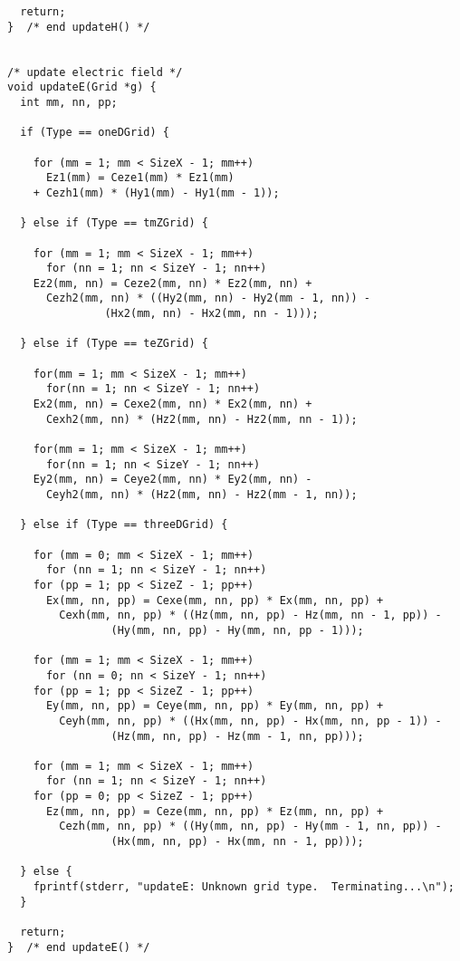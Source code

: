 \begin{program}
\begin{lstlisting}
  return;
}  /* end updateH() */


/* update electric field */
void updateE(Grid *g) {
  int mm, nn, pp;
  
  if (Type == oneDGrid) {
    
    for (mm = 1; mm < SizeX - 1; mm++)
      Ez1(mm) = Ceze1(mm) * Ez1(mm) 
	+ Cezh1(mm) * (Hy1(mm) - Hy1(mm - 1));
    
  } else if (Type == tmZGrid) {
    
    for (mm = 1; mm < SizeX - 1; mm++)
      for (nn = 1; nn < SizeY - 1; nn++)
	Ez2(mm, nn) = Ceze2(mm, nn) * Ez2(mm, nn) +
	  Cezh2(mm, nn) * ((Hy2(mm, nn) - Hy2(mm - 1, nn)) -
			   (Hx2(mm, nn) - Hx2(mm, nn - 1)));

  } else if (Type == teZGrid) {
    
    for(mm = 1; mm < SizeX - 1; mm++)
      for(nn = 1; nn < SizeY - 1; nn++)
	Ex2(mm, nn) = Cexe2(mm, nn) * Ex2(mm, nn) +
	  Cexh2(mm, nn) * (Hz2(mm, nn) - Hz2(mm, nn - 1));
    
    for(mm = 1; mm < SizeX - 1; mm++)
      for(nn = 1; nn < SizeY - 1; nn++)
	Ey2(mm, nn) = Ceye2(mm, nn) * Ey2(mm, nn) -
	  Ceyh2(mm, nn) * (Hz2(mm, nn) - Hz2(mm - 1, nn));
    
  } else if (Type == threeDGrid) {
    
    for (mm = 0; mm < SizeX - 1; mm++)
      for (nn = 1; nn < SizeY - 1; nn++)
	for (pp = 1; pp < SizeZ - 1; pp++)
	  Ex(mm, nn, pp) = Cexe(mm, nn, pp) * Ex(mm, nn, pp) +
	    Cexh(mm, nn, pp) * ((Hz(mm, nn, pp) - Hz(mm, nn - 1, pp)) -
				(Hy(mm, nn, pp) - Hy(mm, nn, pp - 1)));
    
    for (mm = 1; mm < SizeX - 1; mm++)
      for (nn = 0; nn < SizeY - 1; nn++)
	for (pp = 1; pp < SizeZ - 1; pp++)
	  Ey(mm, nn, pp) = Ceye(mm, nn, pp) * Ey(mm, nn, pp) + 
	    Ceyh(mm, nn, pp) * ((Hx(mm, nn, pp) - Hx(mm, nn, pp - 1)) -
				(Hz(mm, nn, pp) - Hz(mm - 1, nn, pp)));
    
    for (mm = 1; mm < SizeX - 1; mm++)
      for (nn = 1; nn < SizeY - 1; nn++)
	for (pp = 0; pp < SizeZ - 1; pp++)
	  Ez(mm, nn, pp) = Ceze(mm, nn, pp) * Ez(mm, nn, pp) +
	    Cezh(mm, nn, pp) * ((Hy(mm, nn, pp) - Hy(mm - 1, nn, pp)) -
				(Hx(mm, nn, pp) - Hx(mm, nn - 1, pp)));

  } else {
    fprintf(stderr, "updateE: Unknown grid type.  Terminating...\n");
  }
  
  return;
}  /* end updateE() */
\end{lstlisting}
\end{program}

